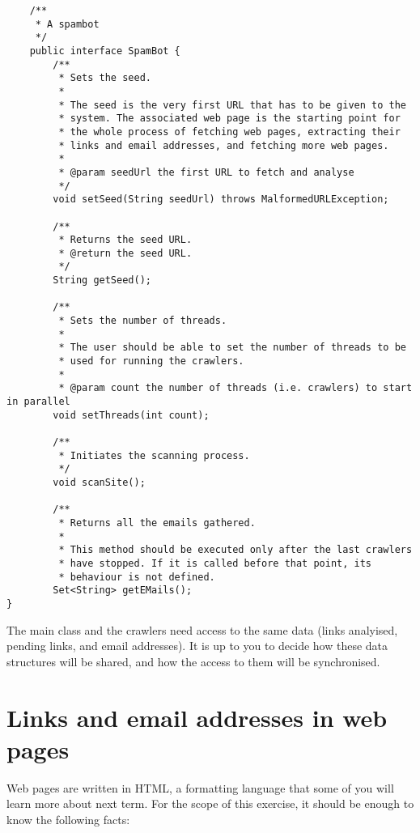 \documentclass{article}
\begin{document}
\begin{verbatim}
    /**
     * A spambot
     */
    public interface SpamBot {
        /** 
         * Sets the seed. 
         * 
         * The seed is the very first URL that has to be given to the
         * system. The associated web page is the starting point for
         * the whole process of fetching web pages, extracting their 
         * links and email addresses, and fetching more web pages. 
         *
         * @param seedUrl the first URL to fetch and analyse
         */
        void setSeed(String seedUrl) throws MalformedURLException;

        /**
         * Returns the seed URL.
         * @return the seed URL.
         */
        String getSeed();

        /**
         * Sets the number of threads. 
         * 
         * The user should be able to set the number of threads to be
         * used for running the crawlers. 
         * 
         * @param count the number of threads (i.e. crawlers) to start in parallel
        void setThreads(int count);

        /**
         * Initiates the scanning process. 
         */
        void scanSite();

        /**
         * Returns all the emails gathered. 
         * 
         * This method should be executed only after the last crawlers
         * have stopped. If it is called before that point, its
         * behaviour is not defined. 
        Set<String> getEMails();
}
\end{verbatim}

The main class and the crawlers need access to the same data (links
analyised, pending links, and email addresses). It is up to you to
decide how these data structures will be shared, and how the access to
them will be synchronised. 

\appendix

\section{Links and email addresses in web pages}
\label{sec:links-email-addr}

Web pages are written in HTML, a formatting language that some of you
will learn more about next term. For the scope of this exercise, it
should be enough to know the following facts: 
\end{document}
